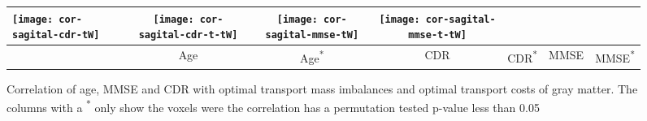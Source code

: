 \begin{figure}[bth]
\begin{tabular}{l|cc|cc|cc}
\texttt{[image: cor-sagital-cdr-tW]} &
\texttt{[image: cor-sagital-cdr-t-tW]} &
\texttt{[image: cor-sagital-mmse-tW]} &
\texttt{[image: cor-sagital-mmse-t-tW]} \\ \hline \hline
%
& \parbox[b][4mm]{6mm}{Age} 
& \parbox[b][4mm]{6mm}{Age\textsuperscript{*}} 
& \parbox[b][4mm]{6mm}{CDR} 
& \parbox[b][4mm]{6mm}{CDR\textsuperscript{*}}
& \parbox[b][4mm]{6mm}{MMSE}
& \parbox[b][4mm]{6mm}{MMSE\textsuperscript{*}}
\end{tabular}
\caption{\label{fig:cor-oasis-gray}
Correlation of age, MMSE and CDR with optimal transport mass imbalances and
optimal transport costs of gray matter. The columns with a \textsuperscript{*}
only show the voxels were the correlation has a permutation tested p-value less
than 0.05  }
\end{figure}
\endgroup

